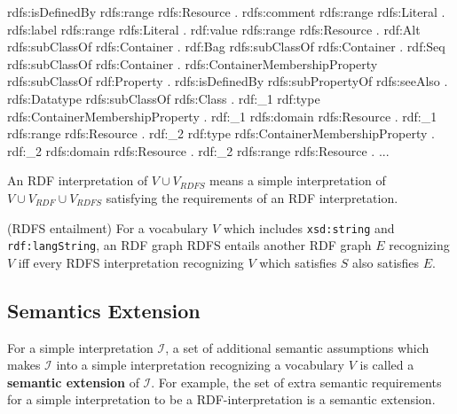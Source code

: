 \documentclass{article}
\begin{document}
\begin{defin}
{rdfs:isDefinedBy rdfs:range rdfs:Resource .\newline
rdfs:comment rdfs:range rdfs:Literal .\newline
rdfs:label rdfs:range rdfs:Literal .\newline
rdf:value rdfs:range rdfs:Resource . \newline
\newline
rdf:Alt rdfs:subClassOf rdfs:Container . \newline
rdf:Bag rdfs:subClassOf rdfs:Container . \newline
rdf:Seq rdfs:subClassOf rdfs:Container . \newline
rdfs:ContainerMembershipProperty rdfs:subClassOf rdf:Property . \newline
\newline
rdfs:isDefinedBy rdfs:subPropertyOf rdfs:seeAlso . \newline
\newline
rdfs:Datatype rdfs:subClassOf rdfs:Class . \newline
\newline
rdf:\_1 rdf:type rdfs:ContainerMembershipProperty . \newline
rdf:\_1 rdfs:domain rdfs:Resource . \newline
rdf:\_1 rdfs:range rdfs:Resource . \newline 
rdf:\_2 rdf:type rdfs:ContainerMembershipProperty . \newline
rdf:\_2 rdfs:domain rdfs:Resource . \newline
rdf:\_2 rdfs:range rdfs:Resource .  \newline
... 
}
\end{defin}

 An RDF interpretation of $V \cup V_{RDFS}$ means a simple interpretation of $V \cup V_{RDF} \cup V_{RDFS}$ satisfying the requirements of an RDF interpretation. 

\begin{defin}(RDFS entailment)\newline
For a vocabulary $V$ which includes \texttt{xsd:string} and \texttt{rdf:langString}, an RDF graph RDFS entails another RDF graph $E$ recognizing $V$ iff every RDFS interpretation recognizing $V$ which satisfies $S$ also satisfies $E$.

\end{defin}

\subsection{Semantics Extension}
For a simple interpretation $\mathcal{I}$, a set of additional semantic assumptions which makes $\mathcal{I} $ into a simple interpretation recognizing a vocabulary $V$ is called a \textbf{semantic extension} of $\mathcal{I}$. For example, the set of extra semantic requirements for a simple interpretation to be a RDF-interpretation is a semantic extension.\newline
\end{document}
